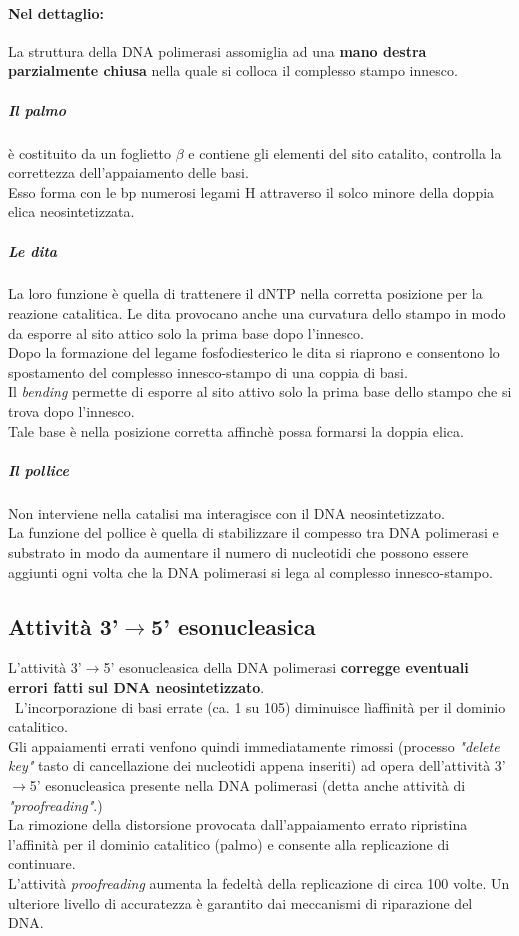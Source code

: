 \documentclass{article}
\begin{document}
\paragraph{Nel dettaglio:} La struttura della DNA polimerasi assomiglia ad una \textbf{mano destra parzialmente chiusa} nella quale si colloca il complesso stampo innesco.
\subparagraph{Il palmo} è costituito da un foglietto $ \beta $ e contiene gli elementi del sito catalito, controlla la correttezza dell'appaiamento delle basi.\\ 
Esso forma con le bp numerosi legami H attraverso il solco minore della doppia elica neosintetizzata.
\subparagraph{Le dita} La loro funzione è quella di trattenere il dNTP nella corretta posizione per la reazione catalitica. Le dita provocano anche una curvatura dello stampo in modo da esporre al sito attico solo la prima base dopo l'innesco.\\
Dopo la formazione del legame fosfodiesterico le dita si riaprono e consentono lo spostamento del complesso innesco-stampo di una coppia di basi.\\
Il \textit{bending} permette di esporre al sito attivo solo la prima base dello stampo che si trova dopo l'innesco.\\
Tale base è nella posizione corretta affinchè possa formarsi la doppia elica.
\subparagraph{Il pollice} Non interviene nella catalisi ma interagisce con il DNA neosintetizzato.\\ 
La funzione del pollice è quella di stabilizzare il compesso tra DNA polimerasi e substrato in modo da aumentare il numero di nucleotidi che possono essere aggiunti ogni volta che la DNA polimerasi si lega al complesso innesco-stampo.
\subsection{Attività 3'$\rightarrow$5' esonucleasica} L'attività 3'$\rightarrow$5' esonucleasica della DNA polimerasi \textbf{corregge eventuali errori fatti sul DNA neosintetizzato}.\\\
L'incorporazione di basi errate (ca. 1 su 105) diminuisce lìaffinità per il dominio catalitico.\\
Gli appaiamenti errati venfono quindi immediatamente rimossi (processo \textit{"delete key"} tasto di cancellazione dei nucleotidi appena inseriti) ad opera dell'attività 3'$\rightarrow$5' esonucleasica presente nella DNA polimerasi (detta anche attività di \textit{"proofreading"}.)\\
La rimozione della distorsione provocata dall'appaiamento errato ripristina l'affinità per il dominio catalitico (palmo) e consente alla replicazione di continuare.\\
L'attività \textit{proofreading} aumenta la fedeltà della replicazione di circa 100 volte. Un ulteriore livello di accuratezza è garantito dai meccanismi di riparazione del DNA.
\end{document}
